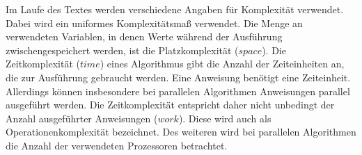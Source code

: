 Im Laufe des Textes werden verschiedene Angaben für Komplexität verwendet.
Dabei wird ein uniformes Komplexitätsmaß verwendet.
Die Menge an verwendeten Variablen, in denen Werte während der Ausführung
zwischengespeichert werden, ist die Platzkomplexität ($space$).
Die Zeitkomplexität ($time$) eines Algorithmus gibt die Anzahl der
Zeiteinheiten an, die zur Ausführung gebraucht werden.
Eine Anweisung benötigt eine Zeiteinheit.
Allerdings können insbesondere bei parallelen Algorithmen Anweisungen parallel
ausgeführt werden.
Die Zeitkomplexität entspricht daher nicht unbedingt der Anzahl ausgeführter
Anweisungen ($work$).
Diese wird auch als Operationenkomplexität bezeichnet.
Des weiteren wird bei parallelen Algorithmen die Anzahl der verwendeten
Prozessoren betrachtet.
